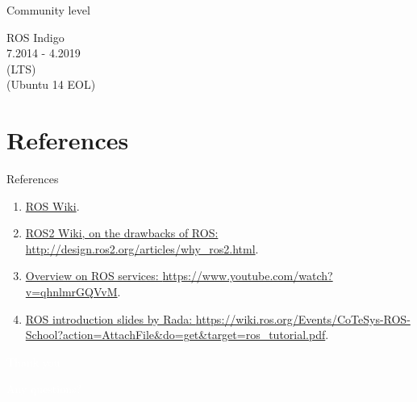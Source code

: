 \documentclass{beamer}
\begin{document}
\begin{frame}{Community level}
\begin{textblock}{3}
         \centering
         ROS Indigo\\
         \footnotesize 7.2014 - 4.2019\\
         (LTS)\\
         (Ubuntu 14 EOL)\\
     \end{textblock}                       
\end{frame}






\section{References}
\begin{frame}{References}

    \begin{enumerate}
        \item \href{http://wiki.ros.org/ROS/Introduction}{ROS Wiki}.
        \item \href{http://design.ros2.org/articles/why_ros2.html}{ROS2 Wiki, on the drawbacks of ROS:  \tiny{http://design.ros2.org/articles/why\_ros2.html}}.
        \item \href{https://www.youtube.com/watch?v=qhnlmrGQVvM}{Overview on ROS services: \tiny{https://www.youtube.com/watch?v=qhnlmrGQVvM}}.
        \item \href{https://wiki.ros.org/Events/CoTeSys-ROS-School?action=AttachFile&do=get&target=ros_tutorial.pdf}{ROS introduction slides by Rada: \tiny{https://wiki.ros.org/Events/CoTeSys-ROS-School?action=AttachFile\&do=get\&target=ros\_tutorial.pdf}}.
    \end{enumerate}
\end{frame}


\begin{frame}[plain]{}  
    \centering
    {\huge \textcolor{white}{Thank you}}
    
    \vspace{0.5cm}
    
    {\huge \textcolor{white}{Any questions?}}
\end{frame}
\end{document}
